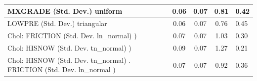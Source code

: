 \begin{table}
\begin{center}
\begin{tabular}{|l|l|c|c|c|l|}
			\hline
			MXGRADE (Std. Dev.) uniform &  & 0.06 & 0.07 & 0.81 & 0.42 \\
			\hline
			LOWPRE (Std. Dev.) triangular &  & 0.06 & 0.07 & 0.76 & 0.45 \\
			\hline
			 Chol: FRICTION (Std. Dev. ln_normal) ) &  & 0.07 & 0.07 & 1.03 & 0.30 \\
			\hline
			 Chol: HISNOW (Std. Dev. tn_normal) ) &  & 0.09 & 0.07 & 1.27 & 0.21 \\
			\hline
			 Chol: HISNOW (Std. Dev. tn_normal) . FRICTION (Std. Dev.   ln_normal ) &  & 0.07 & 0.07 & 0.92 & 0.36 \\
			\hline
		\end{tabular}
	\end{center}
\end{table}